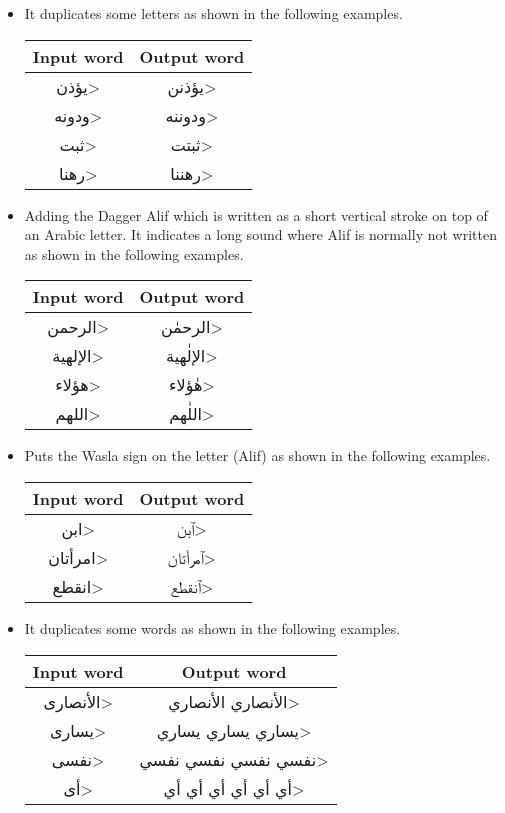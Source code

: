 \documentclass[conference]{IEEEtran}
\begin{document}
\begin{itemize}
\item It duplicates some letters as shown in the following examples.
\begin{center}
\begin{tabular}{|c|c|}
\hline
Input word & Output word \\ \hline
\<يؤذن> & 
\<يؤذنن> \\ \hline
\<ودونه> & 
\<ودوننه> \\ \hline
\<ثبت> & 
\<ثبتت> \\ \hline
\<رهنا> & 
\<رهننا> \\ \hline
\end{tabular}
\end{center}

\item Adding the Dagger Alif which is written as a short vertical stroke on top of an Arabic letter. It indicates a long  sound where Alif is normally not written as shown in the following examples.
\begin{center}
\begin{tabular}{|c|c|}
\hline
Input word & Output word \\ \hline
\<الرحمن> & 
\<الرحمٰن> \\ \hline
\<الإلهية> & 
\<الإلٰهية> \\ \hline
\<هؤلاء> & 
\<هٰؤلاء> \\ \hline
\<اللهم> & 
\<اللٰهم> \\ \hline
\end{tabular}
\end{center}

\item Puts the Wasla sign on the letter (Alif) as shown in the following examples.
\begin{center}
\begin{tabular}{|c|c|}
\hline
Input word & Output word \\ \hline
\<ابن> & 
\<ٱبن> \\ \hline
\<امرأتان> & 
\<ٱمرأتان> \\ \hline
\<انقطع> & 
\<ٱنقطع> \\ \hline
\end{tabular}
\end{center}

\item It duplicates some words as shown in the following examples.
\begin{center}
\begin{tabular}{|c|c|}
\hline
Input word & Output word \\ \hline
\<الأنصارى> & 
\<الأنصاري الأنصاري> \\ \hline
\<يسارى> & 
\<يساري يساري يساري> \\ \hline
\<نفسى> & 
\<نفسي نفسي نفسي نفسي> \\ \hline
\<أى> & 
\<أي أي أي أي أي أي> \\ \hline
\end{tabular}
\end{center}
\end{itemize}
\end{document}
